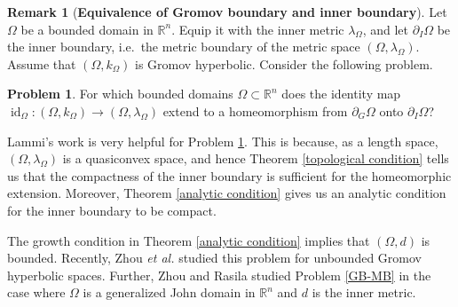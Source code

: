 \documentclass[a4paper,12pt]{amsart}
\theoremstyle{definition}
\newtheorem{prob}[equation]{Problem}
\newtheorem{rem}{Remark}[section]
\begin{document}
\begin{rem}[\textbf{Equivalence of Gromov boundary and inner boundary}]
	Let $\Omega$ be a bounded domain in $\mathbb{R}^n$. Equip it with the inner metric $\lambda_{\Omega}$, and let $\partial_I\Omega$ be the inner boundary, i.e.\ the metric boundary of the metric space $(\Omega, \lambda_{\Omega})$. Assume that $(\Omega,k_{\Omega})$ is Gromov hyperbolic. Consider the following problem.
	\begin{prob}\label{GB-IB}
		For which bounded domains $\Omega\subset\mathbb{R}^n$ does the identity map $\operatorname{id}_\Omega:(\Omega,k_{\Omega})\to(\Omega, \lambda_\Omega)$ extend to a homeomorphism from $\partial_{G}\Omega$ onto $\partial_I\Omega$?
	\end{prob}
	Lammi's work \cite{Lammi-2011,Lammi-Thesis} is very helpful for Problem \ref{GB-IB}. This is because, as a length space, $(\Omega,\lambda_{\Omega})$ is a quasiconvex space, and hence Theorem \ref{topological condition} tells us that the compactness of the inner boundary is sufficient for the homeomorphic extension. Moreover, Theorem \ref{analytic condition} gives us an analytic condition for the inner boundary to be compact.
\end{rem}

The growth condition in Theorem \ref{analytic condition} implies that $(\Omega,d)$ is bounded. Recently, Zhou \textit{et al.} \cite[Theorem 1.8]{Zhou-2022} studied this problem for unbounded Gromov hyperbolic spaces. Further, Zhou and Rasila \cite{Rasila-2021} studied Problem \ref{GB-MB} in the case where $\Omega$ is a generalized John domain in $\mathbb{R}^n$ and $d$ is the inner metric.
\end{document}

